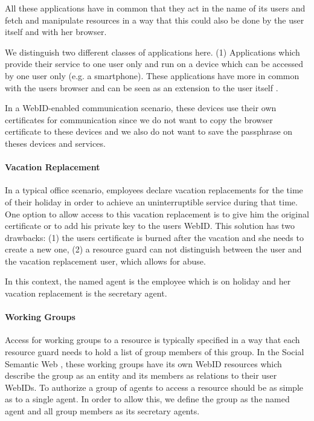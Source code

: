 \documentclass[a4paper]{llncs}
\begin{document}
All these applications have in common that they act in the name of its users and fetch and manipulate resources in a way that this could also be done by the user itself and with her browser.

We distinguish two different classes of applications here.
(1) Applications which provide their service to one user only and run on a device which can be accessed by one user only (e.g. a smartphone).
These applications have more in common with the users browser and can be seen as an extension to the user itself \cite{clark-a-1998-7-a}.


In a WebID-enabled communication scenario, these devices use their own certificates for communication since we do not want to copy the browser certificate to these devices and we also do not want to save the passphrase on theses devices and services.


\paragraph{Vacation Replacement}

In a typical office scenario, employees declare vacation replacements for the time of their holiday in order to achieve an uninterruptible service during that time.
One option to allow access to this vacation replacement is to give him the original certificate or to add his private key to the users WebID.
This solution has two drawbacks: (1) the users certificate is burned after the vacation and she needs to create a new one, (2) a resource guard can not distinguish between the user and the vacation replacement user, which allows for abuse.

In this context, the named agent is the employee which is on holiday and her vacation replacement is the secretary agent.

\paragraph{Working Groups}\label{sec:WorkingGroups}
Access for working groups to a resource is typically specified in a way that each resource guard  needs to hold a list of group members of this group.
In the Social Semantic Web , these working groups have its own WebID resources which describe the group as an entity and its members as relations to their user WebIDs.
To authorize a group of agents to access a resource should be as simple as to a single agent.
In order to allow this, we define the group as the named agent and all group members as its secretary agents.
\end{document}
